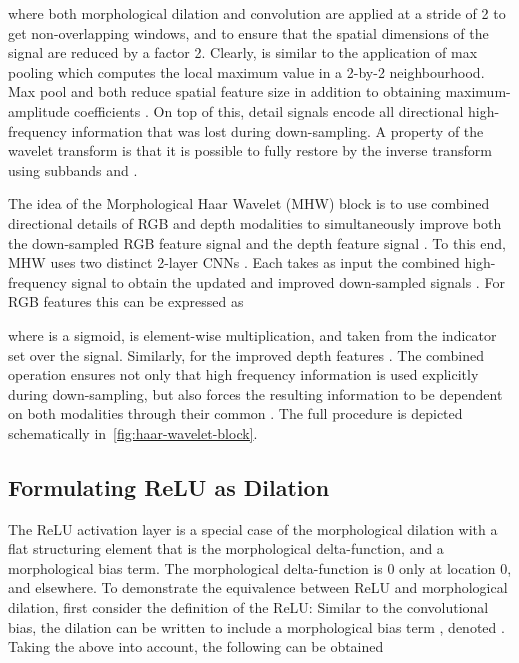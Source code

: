 \documentclass{article}
\begin{document}
where both morphological dilation  and convolution  are applied at a stride of 2 to get non-overlapping windows, and to ensure that the spatial dimensions of the signal  are reduced by a factor 2.
Clearly,  is similar to the application of max pooling which computes the local maximum value in a 2-by-2 neighbourhood.
Max pool and  both reduce spatial feature size in addition to obtaining maximum-amplitude coefficients \cite{chen2013deep,xie2014spatial}.
On top of this, detail signals  encode all directional high-frequency information that was lost during down-sampling.
A property of the wavelet transform is that it is possible to fully restore  by the inverse transform using subbands  and .

The idea of the Morphological Haar Wavelet (MHW) block is to use combined directional details of RGB and depth modalities  to simultaneously improve both the down-sampled RGB feature signal  and the depth feature signal .
To this end, MHW uses two distinct 2-layer CNNs .
Each  takes as input the combined high-frequency signal  to obtain the updated and improved down-sampled signals . 
For RGB features this can be expressed as

where  is a sigmoid,  is element-wise multiplication, and  taken from the indicator set over the signal. 
Similarly, for the improved depth features . 
The combined operation ensures not only that high frequency information is used explicitly during down-sampling, but also forces the resulting information to be dependent on both modalities through their common .
The full procedure is depicted schematically in~\autoref{fig:haar-wavelet-block}.

\subsection{Formulating ReLU as Dilation} \label{sec:method:relu-as-dilation}
The ReLU activation layer \cite{fukushima1975cognitron} is a special case of the morphological dilation with a flat structuring element that is the morphological delta-function, and a morphological bias term.
The morphological delta-function  is 0 only at location 0, and  elsewhere.
To demonstrate the equivalence between ReLU and morphological dilation, first consider the definition of the ReLU:
 \label{eq:morphological-dilation-with-bias}
Similar to the convolutional bias, the dilation can be written to include a morphological bias term \cite{charisopoulos2017morphological}, denoted .
Taking the above into account, the following can be obtained
\end{document}
